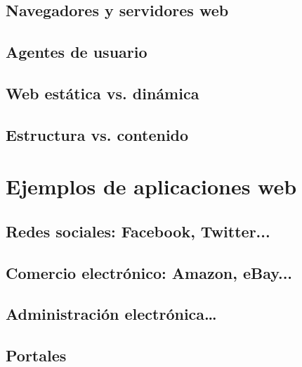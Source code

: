 \documentclass[a4paper,11pt,spanish]{sphinxmanual}
\begin{document}
\subsection{Navegadores y servidores web}
\label{\detokenize{introduccion:navegadores-y-servidores-web}}

\subsection{Agentes de usuario}
\label{\detokenize{introduccion:agentes-de-usuario}}

\subsection{Web estática vs. dinámica}
\label{\detokenize{introduccion:web-estatica-vs-dinamica}}

\subsection{Estructura vs. contenido}
\label{\detokenize{introduccion:estructura-vs-contenido}}

\section{Ejemplos de aplicaciones web}
\label{\detokenize{introduccion:ejemplos-de-aplicaciones-web}}

\subsection{Redes sociales: Facebook, Twitter...}
\label{\detokenize{introduccion:redes-sociales-facebook-twitter}}

\subsection{Comercio electrónico: Amazon, eBay...}
\label{\detokenize{introduccion:comercio-electronico-amazon-ebay}}

\subsection{Administración electrónica…}
\label{\detokenize{introduccion:administracion-electronica}}

\subsection{Portales}
\label{\detokenize{introduccion:portales}}
\end{document}
